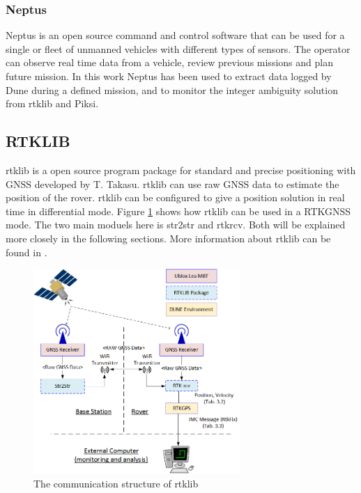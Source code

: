 \subsubsection{Neptus}
Neptus is an open source command and control software that can be used for a single or fleet of unmanned vehicles with different types of sensors. The operator can observe real time data from a vehicle, review previous missions and plan future mission. In this work Neptus has been used to extract data logged by Dune during a defined mission, and to monitor the integer ambiguity solution from \gls{rtklib} and Piksi.
\subsection{RTKLIB}\label{ss:Rtklib}
\acrfull{rtklib} is a open source program package for standard and precise positioning with GNSS developed by T. Takasu. \gls{rtklib} can use raw GNSS data to estimate the position of the rover. \gls{rtklib} can be configured to give a position solution in real time in differential mode. Figure \ref{figure:RTKLIB_STRUCTURE} shows how \gls{rtklib} can be used in a RTKGNSS mode. The two main moduels here is str2str and rtkrcv. Both will be explained more closely in the following sections. More information about  \gls{rtklib} can be found in \citep{Rtklib242}.

\begin{figure}[H]
	\centering
		\includegraphics[width=0.7\textwidth]{figs/RTKLIB.png}
		\caption{The communication structure of \gls{rtklib}}
		\label{figure:RTKLIB_STRUCTURE}
\end{figure}
